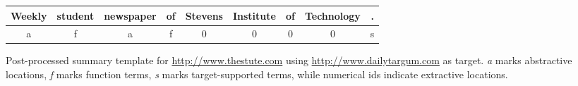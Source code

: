 \begin{tabular}{| c | c | c | c | c | c | c | c | c |}
Weekly & student & newspaper & of & Stevens & Institute & of & Technology & .\\
\hline
a & f & a & f & 0 & 0 & 0 & 0 & s\\
\end{tabular}
\caption{Post-processed summary template for \url{http://www.thestute.com} using \url{http://www.dailytargum.com} as target. \emph{a} marks abstractive locations, \emph{f} marks function terms, \emph{s} marks target-supported terms, while numerical ids indicate extractive locations.}
